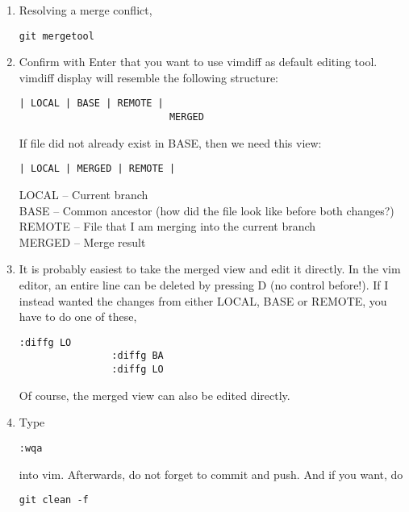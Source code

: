 \documentclass[12pt, a4paper]{scrbook}
\numberwithin{equation}{section}
\theoremstyle{definition}
\theoremstyle{definition}
\begin{document}
		\begin{enumerate}
			\item Resolving a merge conflict,
			
			\begin{lstlisting}[style=mystylebash, label=alg:mergetool, xleftmargin=\parindent]
				git mergetool
			\end{lstlisting}
		
			\item Confirm with Enter that you want to use vimdiff as default editing tool. vimdiff display will resemble the following structure: 
			
			\begin{lstlisting}[style=mystylebash, xleftmargin=\parindent]
				| LOCAL | BASE | REMOTE | 
				          MERGED
			\end{lstlisting}
			
			If file did not already exist in BASE, then we need this view: 
			
			\begin{lstlisting}[style=mystylebash, xleftmargin=\parindent]	
				| LOCAL | MERGED | REMOTE |
			\end{lstlisting}
			
			\noindent LOCAL  -- Current branch
			\\ BASE   -- Common ancestor (how did the file look like before both changes?)
			\\ REMOTE -- File that I am merging into the current branch
			\\ MERGED -- Merge result
			
			\item It is probably easiest to take the merged view and edit it directly. In the vim editor, an entire line can be deleted by pressing D (no control before!). 
			If I instead wanted the changes from either LOCAL, BASE or REMOTE, you have to do one of these,
			
			\begin{lstlisting}[style=mystylebash, label=git_merge_view__actions, xleftmargin=\parindent]
				:diffg LO
				:diffg BA
				:diffg LO
			\end{lstlisting}
			
			Of course, the merged view can also be edited directly.			

			\item Type
			
			\begin{lstlisting}[style=mystylebash, xleftmargin=\parindent]
				:wqa
			\end{lstlisting}
			
			into vim. Afterwards, do not forget to commit and push. And if you want, do 
			
			\begin{lstlisting}[style=mystylebash, label=alg:git_clean, xleftmargin=\parindent]
				git clean -f
			\end{lstlisting}
		
		\end{enumerate}
	
\end{document}
